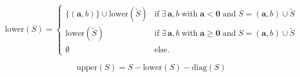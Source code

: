 \begin{equation}
	\text{lower}(S) = \begin{cases}
		\{(\bm{a}, b) \} \cup \text{lower}(\tilde{S}) & \text{if} \; \exists\, \bm a, b \; \text{with} \; \bm a < \bm 0 \; \text{and} \; S = (\bm a, b) \cup \tilde{S} \\
		\text{lower}(\tilde{S}) & \text{if} \; \exists\, \bm a, b \; \text{with} \; \bm a \geq \bm 0 \; \text{and} \; S = (\bm a, b) \cup \tilde{S} \\
		\emptyset & \text{else}.
	\end{cases}
	\label{eq:stencil-lower}
\end{equation}

\begin{equation}
	\text{upper}(S) = S - \text{lower}(S) - \text{diag}(S)
\end{equation}


